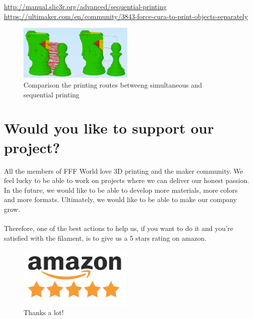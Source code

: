 \documentclass[11pt,a4paper]{article}
\begin{document}
\url{http://manual.slic3r.org/advanced/sequential-printing}\\
\url{https://ultimaker.com/en/community/3843-force-cura-to-print-objects-separately}
\begin{figure}[H]
\centering
\includegraphics[width=0.5\textwidth,cfbox=azul_marcos 4pt 0pt]{FOTOS/SEQUENTIALPRINTING}
\caption*{Comparison the printing routes betweeng simultaneous and sequential printing}
\end{figure}
\section{Would you like to support our project?}
All the members of FFF World love 3D printing and the maker community. We feel lucky to be able to work on projects where we can deliver our honest passion. In the future, we would like to be able to develop more materials, more colors and more formats. Ultimately, we would like to be able to make our company grow.
\\\\
Therefore, one of the best actions to help us, if you want to do it and you’re satisfied with the filament, is to give us a 5 stars rating on amazon.
\begin{figure}[H]
\centering
\includegraphics[width=0.5\textwidth,cfbox=azul_marcos 1pt 0pt]{FOTOS/AMAZON_FIVE_STARS}
\caption*{Thanks a lot!}
\end{figure}
\end{document}
